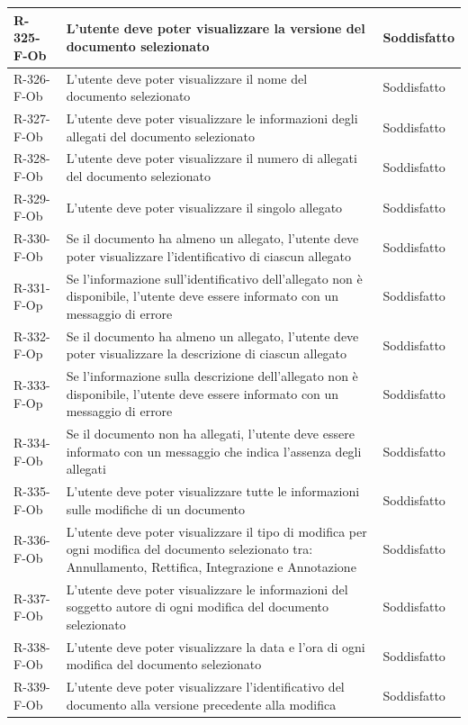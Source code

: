 \begin{longtable}{|p{2.5cm}|p{9.5cm}|p{2.5cm}|}
\hline
R-325-F-Ob & L'utente deve poter visualizzare la versione del documento selezionato & Soddisfatto \\
\hline
R-326-F-Ob & L'utente deve poter visualizzare il nome del documento selezionato & Soddisfatto \\
\hline
R-327-F-Ob & L'utente deve poter visualizzare le informazioni degli allegati del documento selezionato & Soddisfatto \\
\hline
R-328-F-Ob & L'utente deve poter visualizzare il numero di allegati del documento selezionato & Soddisfatto \\
\hline
R-329-F-Ob & L'utente deve poter visualizzare il singolo allegato & Soddisfatto \\
\hline
R-330-F-Ob & Se il documento ha almeno un allegato, l'utente deve poter visualizzare l'identificativo di ciascun allegato & Soddisfatto \\
\hline
R-331-F-Op & Se l'informazione sull'identificativo dell'allegato non è disponibile, l'utente deve essere informato con un messaggio di errore & Soddisfatto \\
\hline
R-332-F-Op & Se il documento ha almeno un allegato, l'utente deve poter visualizzare la descrizione di ciascun allegato & Soddisfatto \\
\hline
R-333-F-Op & Se l'informazione sulla descrizione dell'allegato non è disponibile, l'utente deve essere informato con un messaggio di errore & Soddisfatto \\
\hline
R-334-F-Ob & Se il documento non ha allegati, l'utente deve essere informato con un messaggio che indica l'assenza degli allegati & Soddisfatto \\
\hline
R-335-F-Ob & L'utente deve poter visualizzare tutte le informazioni sulle modifiche di un documento & Soddisfatto \\
\hline
R-336-F-Ob & L'utente deve poter visualizzare il tipo di modifica per ogni modifica del documento selezionato tra: Annullamento, Rettifica, Integrazione e Annotazione & Soddisfatto \\
\hline
R-337-F-Ob & L'utente deve poter visualizzare le informazioni del soggetto autore di ogni modifica del documento selezionato & Soddisfatto \\
\hline
R-338-F-Ob & L'utente deve poter visualizzare la data e l'ora di ogni modifica del documento selezionato & Soddisfatto \\
\hline
R-339-F-Ob & L'utente deve poter visualizzare l'identificativo del documento alla versione precedente alla modifica & Soddisfatto \\

\end{longtable}
